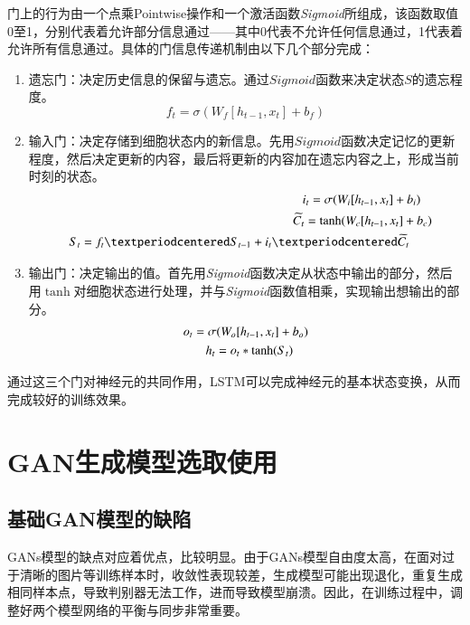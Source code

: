 门上的行为由一个点乘Pointwise操作和一个激活函数\textit{Sigmoid}所组成，该函数取值0至1，分别代表着允许部分信息通过——其中0代表不允许任何信息通过，1代表着允许所有信息通过。具体的门信息传递机制由以下几个部分完成：
\begin{enumerate}[fullwidth,itemindent=2em,label=\arabic*.]
  \item 遗忘门：决定历史信息的保留与遗忘。通过$Sigmoid$函数来决定状态$S$的遗忘程度。
  \begin{equation}
    f_t=\sigma(W_f[h_{t-1}, x_t]+b_f)
    \label{forget}
  \end{equation}
  \item 输入门：决定存储到细胞状态内的新信息。先用$Sigmoid$函数决定记忆的更新程度，然后决定更新的内容，最后将更新的内容加在遗忘内容之上，形成当前时刻的状态。
  \begin{equation}
    \begin{split}
      i_t=\sigma(W_i[h_{t-1}, x_t]+b_i)\hspace{0.2em}\\
      \widetilde{C_t}=\tanh(W_c[h_{t-1}, x_t]+b_c)\hspace{-0.7em}\\
      S_t = f_t·S_{t-1} + i_t · \widetilde{C_t}\hspace{1.1em}
    \end{split}
    \label{input}
  \end{equation}
  \item 输出门：决定输出的值。首先用\textit{Sigmoid}函数决定从状态中输出的部分，然后用$\tanh$对细胞状态进行处理，并与\textit{Sigmoid}函数值相乘，实现输出想输出的部分。
  \begin{equation}
    \begin{split}
      o_t = \sigma(W_o[h_{t-1}, x_t] + b_o)\\
      h_t = o_t*\tanh(S_t)\hspace{1.2em}
    \end{split}
    \label{output}
  \end{equation}
\end{enumerate}

通过这三个门对神经元的共同作用，LSTM可以完成神经元的基本状态变换，从而完成较好的训练效果。

\section{GAN生成模型选取使用}
\subsection{基础GAN模型的缺陷}
GANs模型的缺点对应着优点，比较明显。由于GANs模型自由度太高，在面对过于清晰的图片等训练样本时，收敛性表现较差，生成模型可能出现退化，重复生成相同样本点，导致判别器无法工作，进而导致模型崩溃。因此，在训练过程中，调整好两个模型网络的平衡与同步非常重要。

